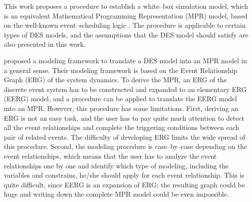 \documentclass[]{interact}
\theoremstyle{plain}%
\theoremstyle{definition}
\theoremstyle{remark}
\begin{document}
This work proposes a procedure to establish a white--box simulation model, which is an equivalent Mathematical Programming Representation (MPR) model, based on the well-known event--scheduling logic \citep{law2014simulation}. %
The procedure is applicable to certain types of DES models, and the assumptions that the DES model should satisfy are also presented in this work.


\cite{chan2008optimization} proposed a modeling framework to translate a DES model into an MPR model in a general sense. Their modeling framework is based on the Event Relationship Graph (ERG) of the system dynamics. To derive the MPR, %
an ERG of the discrete event system has to be constructed and expanded to an elementary ERG (EERG) model, and a procedure can be applied to translate the EERG model into an MPR. %
However, this procedure has some limitations. First, deriving an ERG is not an easy task, and the user has to pay quite much attention to detect all the event relationships and complete the triggering conditions between each pair of related events. %
The difficulty of developing ERG limits the wide spread of this procedure. 
Second, the modeling procedure is case--by--case depending on the event relationships, which means that the user has to analyze the event relationships one by one and identify which type of modeling, including the variables and constrains, he/she should apply for each event relationship. 
This is quite %
difficult, since EERG is an expansion of ERG; the resulting graph could be huge and writing down the complete MPR model could be even impossible.  
\end{document}
